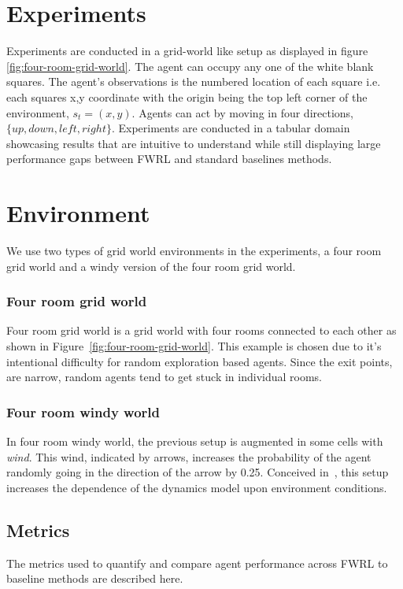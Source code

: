 \section{Experiments}
\label{sec:experiments}

Experiments are conducted in a grid-world like setup as displayed in
figure \ref{fig:four-room-grid-world}. The agent can occupy any one of
the white blank squares. The agent's observations is the numbered
location of each square i.e. each squares x,y coordinate with the origin
being the top left corner of the environment, $s_t = (x, y)$. Agents
can act by moving in four  directions, $\{up, down, left, right\}$.
Experiments are conducted in a tabular domain showcasing results
that are intuitive to understand while still displaying large
performance gaps between FWRL and standard baselines methods. 

\section{Environment}
We use two types of grid world environments in the experiments, a four room grid
world and a windy version of the four room grid world.

\subsubsection{Four room grid world}
Four room grid world is a grid world with four rooms connected to each
other as shown in Figure~\ref{fig:four-room-grid-world}. This example is
chosen due to it's intentional difficulty for random exploration based
agents. Since the exit points, are narrow, random agents tend to get
stuck in individual rooms. 

\subsubsection{Four room windy world}
In four room windy world, the previous setup is augmented in some cells
with \emph{wind}. This wind, indicated by arrows, increases the
probability of the agent randomly going in the direction of the arrow by
0.25.  Conceived in~\citet{SuBaBOOK1998}, this setup increases the
dependence of the dynamics model upon environment conditions. 

\subsection{Metrics}
The metrics used to quantify and compare agent performance across
FWRL to baseline methods are described here.

